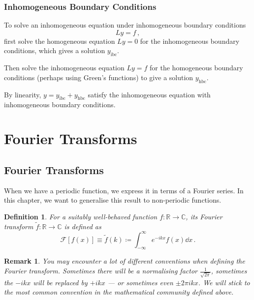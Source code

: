 \documentclass{article}
\theoremstyle{plain}\theoremheaderfont{\normalfont\itshape}\theorembodyfont{\rmfamily}\theoremseparator{.}\newtheorem*{rem}{Remark}\newtheorem*{ex}{Example}\newtheorem*{proof}{Proof}\newtheorem*{altp}{Alternative proof}
\theoremstyle{plain}\theoremheaderfont{\normalfont\bfseries}\theorembodyfont{\rmfamily}\theoremseparator{.}\newtheorem{thm}{Theorem}[section]\newtheorem{lem}[thm]{Lemma}\newtheorem{prop}[thm]{Proposition}\newtheorem*{cor}{Corollary}\newtheorem{defn}[thm]{Definition}\newtheorem{clm}[thm]{Claim}\newtheorem{clminproof}{Claim}
\theoremstyle{break}\theoremheaderfont{\normalfont\itshape}\theorembodyfont{\rmfamily}\theoremseparator{.\medskip}\newtheorem*{proofskip}{Proof}\newtheorem*{exs}{Examples}\newtheorem*{rems}{Remarks}
\theoremstyle{break}\theoremheaderfont{\normalfont\bfseries}\theorembodyfont{\rmfamily}\theoremseparator{.\medskip}\newtheorem{lemskip}[thm]{Lemma}\newtheorem{defnskip}[thm]{Definition}\newtheorem{propskip}[thm]{Proposition}\newtheorem{thmskip}[thm]{Theorem}
\numberwithin{equation}{section}
\begin{document}
	\subsubsection{Inhomogeneous Boundary Conditions}
	To solve an inhomogeneous equation under inhomogeneous boundary conditions
	\[Ly=f\,,\]
	first solve the homogeneous equation \(Ly=0\) for the inhomogeneous boundary conditions, which gives a solution \(y_{\text{ibc}}\).
	
	Then solve the inhomogeneous equation \(Ly=f\) for the homogeneous boundary conditions (perhaps using Green's functions) to give a solution \(y_{\text{hbc}}\).
	
	By linearity, \(y=y_{\text{ibc}}+y_{\text{hbc}}\) satisfy the inhomogeneous equation with inhomogeneous boundary conditions.

	\newpage

	\section{Fourier Transforms}
	\subsection{Fourier Transforms}
	When we have a periodic function, we express it in terms of a Fourier series. In this chapter, we want to generalise this result to non-periodic functions.
	\begin{defn}
		For a suitably well-behaved function \(f:\mathbb{R}\to\mathbb{C}\), its \textit{Fourier transform} \(\tilde{f}:\mathbb{R}\to\mathbb{C}\) is defined as
		\[\mathcal{F}[f(x)]\equiv\tilde{f}(k)\coloneqq\int_{-\infty}^{\infty}e^{-ikx}f(x)\dd{x}\,.\]
	\end{defn}
	\begin{rem}
		You may encounter a lot of different conventions when defining the Fourier transform. Sometimes there will be a normalising factor \(\frac{1}{\sqrt{2\pi}}\), sometimes the \(-ikx\) will be replaced by \(+ikx\) --- or sometimes even \(\pm 2\pi ikx\). We will stick to the most common convention in the mathematical community defined above.
	\end{rem}
	
\end{document}
